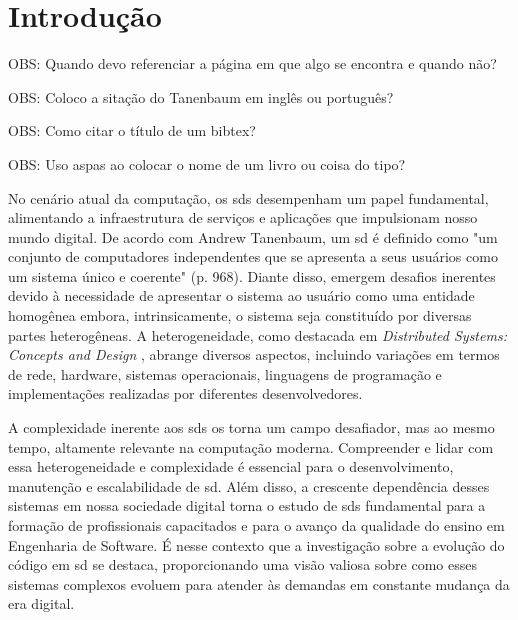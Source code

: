 
\chapter{Introdução}\label{cap:introducao}
OBS: Quando devo referenciar a página em que algo se encontra e quando não?

OBS: Coloco a sitação do Tanenbaum em inglês ou português?

OBS: Como citar o título de um bibtex?

OBS: Uso aspas ao colocar o nome de um livro ou coisa do tipo?

No cenário atual da computação, os \gls{sds} desempenham um papel fundamental, alimentando a infraestrutura de serviços e aplicações que impulsionam nosso mundo digital. De acordo com Andrew Tanenbaum, um \gls{sd} é definido como "um conjunto de computadores independentes que se apresenta a seus usuários como um sistema único e coerente" \cite{TanenbaumDistributedSystemsThirdEdition}(p. 968). Diante disso, emergem desafios inerentes devido à necessidade de apresentar o sistema ao usuário como uma entidade homogênea embora, intrinsicamente, o sistema seja constituído por diversas partes heterogêneas. A heterogeneidade, como destacada em \textit{Distributed Systems: Concepts and Design} \cite{DistributedSystemsCoulouris}, abrange diversos aspectos, incluindo variações em termos de rede, hardware, sistemas operacionais, linguagens de programação e implementações realizadas por diferentes desenvolvedores.

A complexidade inerente aos \gls{sds} os torna um campo desafiador, mas ao mesmo tempo, altamente relevante na computação moderna. Compreender e lidar com essa heterogeneidade e complexidade é essencial para o desenvolvimento, manutenção e escalabilidade de \gls{sd}. Além disso, a crescente dependência desses sistemas em nossa sociedade digital torna o estudo de \gls{sds} fundamental para a formação de profissionais capacitados e para o avanço da qualidade do ensino em Engenharia de Software. É nesse contexto que a investigação sobre a evolução do código em \gls{sd} se destaca, proporcionando uma visão valiosa sobre como esses sistemas complexos evoluem para atender às demandas em constante mudança da era digital.


